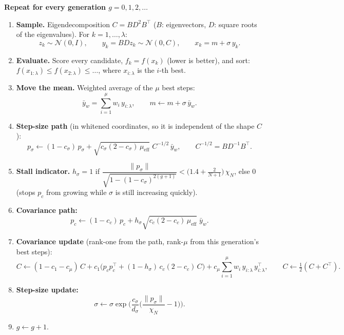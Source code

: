 \documentclass[11pt,a4paper]{article}
\begin{document}
\noindent\textbf{Repeat for every generation $g = 0, 1, 2, \dots$}
\begin{enumerate}
  \item \textbf{Sample.} Eigendecomposition $C = B D^2 B^{\top}$ ($B$: eigenvectors, $D$: square roots of the
        eigenvalues). For $k = 1, \dots, \lambda$:
        \[
          z_k \sim \mathcal{N}(0, I), \qquad y_k = B D z_k \sim \mathcal{N}(0, C), \qquad x_k = m + \sigma\, y_k .
        \]
  \item \textbf{Evaluate.} Score every candidate, $f_k = f(x_k)$ (lower is better), and sort:
        $f(x_{1:\lambda}) \le f(x_{2:\lambda}) \le \dots$, where $x_{i:\lambda}$ is the $i$-th best.
  \item \textbf{Move the mean.} Weighted average of the $\mu$ best steps:
        \[
          \bar y_w = \sum_{i=1}^{\mu} w_i\, y_{i:\lambda}, \qquad m \leftarrow m + \sigma\, \bar y_w .
        \]
  \item \textbf{Step-size path} (in whitened coordinates, so it is independent of the shape $C$):
        \[
          p_\sigma \leftarrow (1 - c_\sigma)\, p_\sigma + \sqrt{c_\sigma (2 - c_\sigma)\, \mu_{\mathrm{eff}}}\;
          C^{-1/2}\, \bar y_w, \qquad C^{-1/2} = B D^{-1} B^{\top}.
        \]
  \item \textbf{Stall indicator.} $h_\sigma = 1$ if
        $\dfrac{\|p_\sigma\|}{\sqrt{1 - (1 - c_\sigma)^{2(g+1)}}} < \big(1.4 + \tfrac{2}{N + 1}\big)\, \chi_N$,
        else $0$ (stops $p_c$ from growing while $\sigma$ is still increasing quickly).
  \item \textbf{Covariance path:}
        \[
          p_c \leftarrow (1 - c_c)\, p_c + h_\sigma \sqrt{c_c (2 - c_c)\, \mu_{\mathrm{eff}}}\; \bar y_w .
        \]
  \item \textbf{Covariance update} (rank-one from the path, rank-$\mu$ from this generation's best steps):
        \[
          C \leftarrow (1 - c_1 - c_\mu)\, C
            + c_1 \big( p_c p_c^{\top} + (1 - h_\sigma)\, c_c (2 - c_c)\, C \big)
            + c_\mu \sum_{i=1}^{\mu} w_i\, y_{i:\lambda}\, y_{i:\lambda}^{\top},
          \qquad C \leftarrow \tfrac12 (C + C^{\top}).
        \]
  \item \textbf{Step-size update:}
        \[
          \sigma \leftarrow \sigma \exp\!\Big( \frac{c_\sigma}{d_\sigma} \Big( \frac{\|p_\sigma\|}{\chi_N} - 1 \Big) \Big).
        \]
  \item $g \leftarrow g + 1$.
\end{enumerate}
\end{document}
